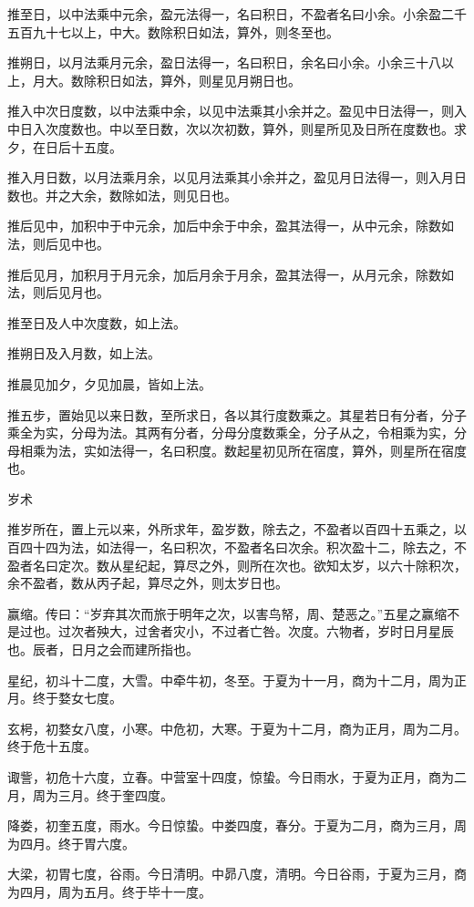 \documentclass[]{article}
\begin{document}
推至日，以中法乘中元余，盈元法得一，名曰积日，不盈者名曰小余。小余盈二千五百九十七以上，中大。数除积日如法，算外，则冬至也。

推朔日，以月法乘月元余，盈日法得一，名曰积日，余名曰小余。小余三十八以上，月大。数除积日如法，算外，则星见月朔日也。

推入中次日度数，以中法乘中余，以见中法乘其小余并之。盈见中日法得一，则入中日入次度数也。中以至日数，次以次初数，算外，则星所见及日所在度数也。求夕，在日后十五度。

推入月日数，以月法乘月余，以见月法乘其小余并之，盈见月日法得一，则入月日数也。并之大余，数除如法，则见日也。

推后见中，加积中于中元余，加后中余于中余，盈其法得一，从中元余，除数如法，则后见中也。

推后见月，加积月于月元余，加后月余于月余，盈其法得一，从月元余，除数如法，则后见月也。

推至日及人中次度数，如上法。

推朔日及入月数，如上法。

推晨见加夕，夕见加晨，皆如上法。

推五步，置始见以来日数，至所求日，各以其行度数乘之。其星若日有分者，分子乘全为实，分母为法。其两有分者，分母分度数乘全，分子从之，令相乘为实，分母相乘为法，实如法得一，名曰积度。数起星初见所在宿度，算外，则星所在宿度也。

岁术

推岁所在，置上元以来，外所求年，盈岁数，除去之，不盈者以百四十五乘之，以百四十四为法，如法得一，名曰积次，不盈者名曰次余。积次盈十二，除去之，不盈者名曰定次。数从星纪起，算尽之外，则所在次也。欲知太岁，以六十除积次，余不盈者，数从丙子起，算尽之外，则太岁日也。

赢缩。传曰：``岁弃其次而旅于明年之次，以害鸟帑，周、楚恶之。''五星之赢缩不是过也。过次者殃大，过舍者灾小，不过者亡咎。次度。六物者，岁时日月星辰也。辰者，日月之会而建所指也。

星纪，初斗十二度，大雪。中牵牛初，冬至。于夏为十一月，商为十二月，周为正月。终于婺女七度。

玄枵，初婺女八度，小寒。中危初，大寒。于夏为十二月，商为正月，周为二月。终于危十五度。

诹訾，初危十六度，立春。中营室十四度，惊蛰。今日雨水，于夏为正月，商为二月，周为三月。终于奎四度。

降娄，初奎五度，雨水。今日惊蛰。中娄四度，春分。于夏为二月，商为三月，周为四月。终于胃六度。

大梁，初胃七度，谷雨。今日清明。中昴八度，清明。今日谷雨，于夏为三月，商为四月，周为五月。终于毕十一度。
\end{document}
